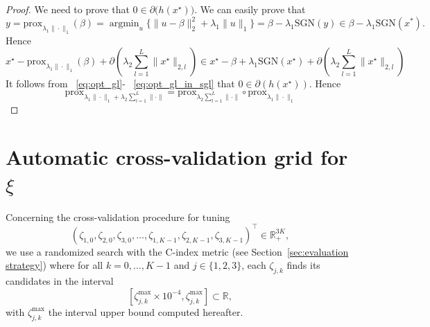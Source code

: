 \documentclass[11pt]{article}
\DeclareMathOperator{\argmin}{argmin}
\newcommand{\norm}[1]{\|#1\|}
\newcommand{\R}{\mathds R}
\begin{document}
\begin{proof}
\noindent We need to prove that $0 \in \partial\big(h(x^\star)\big)$. We can easily prove that 
\begin{equation*}
    y = \text{prox}_{\lambda_1 \norm{\cdot}_1}(\beta) 
    = \argmin_{u} \{\norm{u - \beta}_2^2 + \lambda_1 \norm{u}_1\} 
    = \beta - \lambda_1 \text{SGN}(y) \in \beta - \lambda_1 \text{SGN}(x^*).
\end{equation*}
Hence
\begin{equation}
    \label{eq:opt_gl_in_sgl}
    x^\star - \text{prox}_{\lambda_1 \norm{\cdot}_1}(\beta) + \partial( \lambda_2 \sum_{l=1}^L \norm{x^\star}_{2, l} ) \in x^\star- \beta + \lambda_1 \text{SGN}(x^\star) + \partial( \lambda_2 \sum_{l=1}^L \norm{x^\star}_{2, l} )
\end{equation}
It follows from ~\eqref{eq:opt_gl}- ~\eqref{eq:opt_gl_in_sgl} that $0 \in \partial(h(x^\star))$. Hence
\begin{equation*}
    \text{prox}_{\lambda_1 \norm{\cdot}_1 + \lambda_2 \sum_{l=1}^L \norm{\cdot}} = \text{prox}_{\lambda_2 \sum_{l=1}^L \norm{\cdot}} \circ \text{prox}_{\lambda_1 \norm{\cdot}_1}
\end{equation*}
\end{proof}

\section{Automatic cross-validation grid for $\xi$}
\label{sec:auto-grid-cv}

Concerning the cross-validation procedure for tuning 
\[(\zeta_{1,0}, \zeta_{2,0}, \zeta_{3,0}, \ldots, \zeta_{1,K-1}, \zeta_{2,K-1}, \zeta_{3,K-1})^\top \in \R_+^{3K}, \]
we use a randomized search with the C-index metric (see Section~\ref{sec:evaluation strategy}) where for all $k=0, \ldots, K-1$ and $j \in \{1, 2, 3\}$, each $\zeta_{j,k}$ finds its candidates in the interval 
\[[\zeta_{j,k}^{\text{max}} \times 10^{-4}, \zeta_{j,k}^{\text{max}} ] \subset \R, \]
with $\zeta_{j,k}^{\text{max}}$ the interval upper bound computed hereafter.
\end{document}
